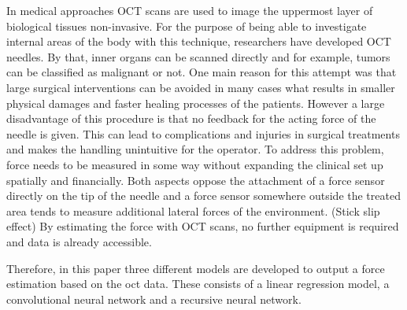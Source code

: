 

In medical approaches OCT scans are used to image the uppermost layer of biological tissues non-invasive.
For the purpose of being able to investigate internal areas of the body with this technique, researchers have developed 
OCT needles. By that, inner organs can be scanned directly and for example, tumors can be classified as malignant or not.
One main reason for this attempt was that large surgical interventions can be avoided in many cases what 
results in smaller physical damages and faster healing processes of the patients.
However a large disadvantage of this procedure is that no feedback for the acting force of the needle is given.
This can lead to complications and injuries in surgical treatments and makes the handling unintuitive for the operator.
To address this problem, force needs to be measured in some way without expanding the clinical set up spatially and financially.
Both aspects oppose the attachment of a force sensor directly on the tip of the needle and a force sensor somewhere 
outside the treated area tends to measure additional lateral forces of the environment. (Stick slip effect)
By estimating the force with OCT scans, no further equipment is required and data is already accessible.

Therefore, in this paper three different models are developed to output a force estimation based on the oct data.
These consists of a linear regression model, a convolutional neural network and a recursive neural network.

